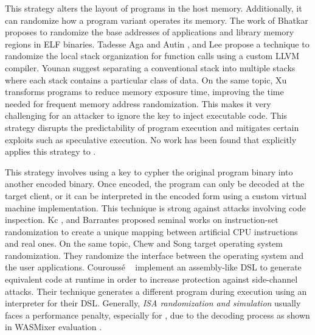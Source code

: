 \begin{strategy}
    \label{mem_strategy}
    This strategy alters the layout of programs in the host memory. 
    Additionally, it can randomize how a program variant operates its memory. 
    The work of Bhatkar \etal \cite{bhatkar03, bhatkar2005efficient} proposes to randomize the base addresses of applications and library memory regions in ELF binaries. 
    Tadesse Aga and Autin \cite{aga2019smokestack}, and Lee \etal \cite{lee2021savior} propose a technique to randomize the local stack organization for function calls using a custom LLVM compiler.
    Younan \etal \cite{Younan2006} suggest separating a conventional stack into multiple stacks where each stack contains a particular class of data. 
    On the same topic, Xu \etal \cite{xu2020merr} transforms programs to reduce memory exposure time, improving the time needed for frequent memory address randomization. 
    This makes it very challenging for an attacker to ignore the key to inject executable code. 
    This strategy disrupts the predictability of program execution and mitigates certain exploits such as speculative execution.
    No work has been found that explicitly applies this strategy to \Wasm.
\end{strategy}

\begin{strategy}
    \label{isa_rand}

    This strategy involves using a key to cypher the original program binary into another encoded binary. 
    Once encoded, the program can only be decoded at the target client, or it can be interpreted in the encoded form using a custom virtual machine implementation. 
    This technique is strong against attacks involving code inspection. 
    Kc \etal \cite{Kc03}, and Barrantes \etal \cite{barrantes2003randomized} proposed seminal works on instruction-set randomization 
    to create a unique mapping between artificial CPU instructions and real ones.
    On the same topic, Chew and Song \cite{Chew02mitigatingbuffer} target operating system randomization. They randomize the interface between the operating system and the user applications.
    Courouss{\'e} \etal~\cite{courousse2016runtime} implement an assembly-like DSL to generate equivalent code at runtime in order to increase protection against side-channel attacks. 
    Their technique generates a different program during execution using an interpreter for their DSL.
    Generally, \emph{ISA randomization and simulation} usually faces a performance penalty, especially for \Wasm, due to the decoding process as shown in WASMixer evaluation \cite{wasmixer}.
\end{strategy}



